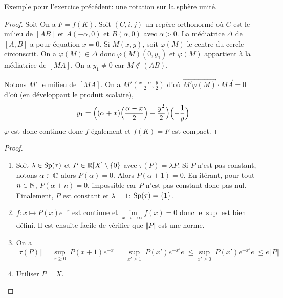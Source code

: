 \begin{remark}
	Exemple pour l'exercice précédent: une rotation sur la sphère unité.
\end{remark}

\begin{proof}
	Soit 
	On a $F=f(K)$. Soit $(C,i,j)$ un repère orthonormé où $C$ est le milieu de $[AB]$ et $A(-\alpha,0)$ et $B(\alpha,0)$ avec $\alpha>0$. La médiatrice $\Delta$ de $[A,B]$ a pour équation $x=0$. Si $M(x,y)$, soit $\varphi(M)$ le centre du cercle circonscrit. On a $\varphi(M)\in\Delta$ donc $\varphi(M)(0,y_{1})$ et $\varphi(M)$ appartient à la médiatrice de $[MA]$. On a $y_{1}\neq0$ car $M\notin(AB)$.

	Notons $M'$ le milieu de $[MA]$. On a $M'(\frac{x-\alpha}{2},\frac{y}{2})$ d'où $\vec{M'\varphi(M)}\cdot\vec{MA}=0$ d'où (en développant le produit scalaire),
	\begin{equation}y_{1}=\Bigl((\alpha+x)\Bigl(\frac{\alpha-x}{2}\Bigr)-\frac{y^{2}}{2}\Bigr)\Bigl(-\frac{1}{y}\Bigr)\end{equation}
	$\varphi$ est donc continue donc $f$ également et $f(K)=F$ est compact.
\end{proof}

\begin{proof}
	\phantom{}
	\begin{enumerate}
		\item Soit $\lambda\in\operatorname{Sp}(\tau)$ et $P\in\mathbb{R}[X]\setminus\{0\}$ avec $\tau(P)=\lambda P$. Si $P$ n'est pas constant, notons $\alpha\in\mathbb{C}$ alors $P(\alpha)=0$. Alors $P(\alpha+1)=0$. En itérant, pour tout $n\in\mathbb{N}$, $P(\alpha+n)=0$, impossible car $P$ n'est pas constant donc pas nul. Finalement, $P$ est constant et $\lambda=1$: $\operatorname{Sp}(\tau)=\{1\}$.
		\item $f\colon x\mapsto P(x)e^{-x}$ est continue et $\lim\limits_{x\to+\infty}f(x)=0$ donc le $\sup$ est bien défini. Il est ensuite facile de vérifier que $\Vert P\Vert$ est une norme.
		\item On a 
		\begin{equation}\Vert\tau(P)\Vert=\sup\limits_{x\geqslant0}\vert P(x+1)e^{-x}\vert=\sup\limits_{x'\geqslant1}\vert P(x')e^{-x'}e\vert\leqslant\sup\limits_{x'\geqslant0}\vert P(x')e^{-x'}e\vert\leqslant e\Vert P\Vert\end{equation}
		\item Utiliser $P=X$.
	\end{enumerate}
\end{proof}

